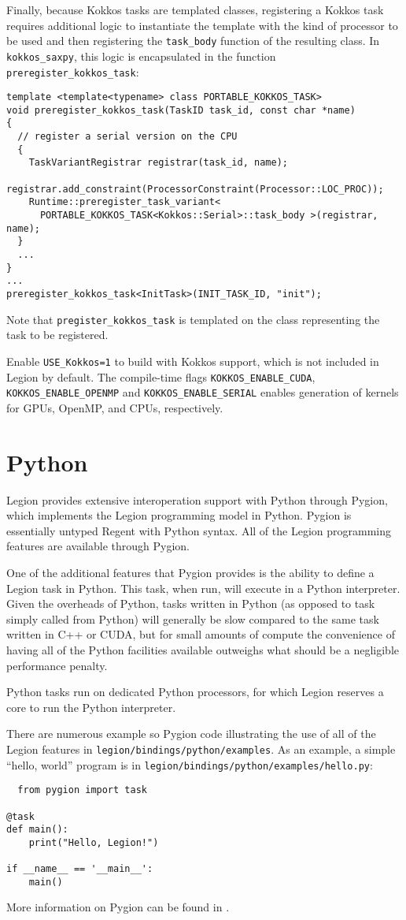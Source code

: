 Finally, because Kokkos tasks are templated classes, registering a Kokkos task requires additional logic to instantiate the template with the kind of processor to be used and then registering the
{\tt task\_body} function of the resulting class.  In {\tt kokkos\_saxpy}, this logic is encapsulated in the function {\tt preregister\_kokkos\_task}:
\begin{lstlisting}
template <template<typename> class PORTABLE_KOKKOS_TASK>
void preregister_kokkos_task(TaskID task_id, const char *name)
{
  // register a serial version on the CPU
  {
    TaskVariantRegistrar registrar(task_id, name);
    registrar.add_constraint(ProcessorConstraint(Processor::LOC_PROC));
    Runtime::preregister_task_variant<
      PORTABLE_KOKKOS_TASK<Kokkos::Serial>::task_body >(registrar, name);
  }
  ...
}
...
preregister_kokkos_task<InitTask>(INIT_TASK_ID, "init");  
\end{lstlisting}
Note that {\tt pregister\_kokkos\_task} is templated on the class representing the task to be registered.

Enable {\tt USE\_Kokkos=1} to build with Kokkos support, which is not included in Legion by default.
The compile-time flags {\tt KOKKOS\_ENABLE\_CUDA}, {\tt KOKKOS\_ENABLE\_OPENMP} and {\tt KOKKOS\_ENABLE\_SERIAL} enables
generation of kernels for GPUs, OpenMP, and CPUs, respectively.

\section{Python}
\label{sec:python}

Legion provides extensive interoperation support with Python through Pygion, which implements the Legion programming model
in Python.  Pygion is essentially untyped Regent with Python syntax.  All of the Legion programming features are available
through Pygion.

One of the additional features that Pygion provides is the ability to define a Legion task in Python.  This task, when run,
will execute in a Python interpreter.  Given the overheads of Python, tasks written in Python (as opposed to task simply
called from Python) will generally be slow compared to the same task written in C++ or CUDA, but for small amounts of compute
the convenience of having all of the Python facilities available outweighs what should be a negligible performance penalty.

Python tasks run on dedicated Python processors, for which Legion reserves a core to run
the Python interpreter.

There are numerous example so Pygion code illustrating the use of all of the Legion features in
{\tt legion/bindings/python/examples}.  As an example, a simple ``hello, world'' program is in
{\tt legion/bindings/python/examples/hello.py}:
\begin{lstlisting}
  from pygion import task

@task
def main():
    print("Hello, Legion!")

if __name__ == '__main__':
    main()
\end{lstlisting}
More information on Pygion can be found in \cite{pygion19}.

